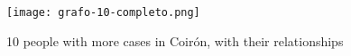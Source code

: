 \vspace{-10pt}
\begin{figure}
	\centering
	\texttt{[image: grafo-10-completo.png]}
	\caption{10 people with more cases in Coirón, with their relationships} 
	\label{fig:grafoTop10}
\end{figure}
\vspace{-20pt}
